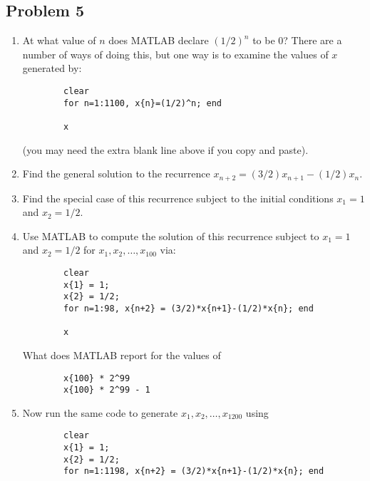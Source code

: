 \documentclass{article}
\begin{document}
\subsection*{Problem 5}
\begin{enumerate}
	\item At what value of $n$ does MATLAB declare $(1/2)^n$ to be $0$?
		There are a number of ways of doing this,
		but one way is to examine the values of $x$ generated by:
		\begin{verbatim}
		clear
		for n=1:1100, x{n}=(1/2)^n; end

		x
		\end{verbatim}
		(you may need the extra blank line above if you copy and paste).
	\item Find the general solution to the recurrence $x_{n+2} = (3/2)x_{n+1}-(1/2)x_n$.
	\item Find the special case of this recurrence subject to
		the initial conditions $x_1 = 1$ and $x_2 = 1/2$.
	\item Use MATLAB to compute the solution of this recurrence subject to
		$x_1 = 1$ and $x_2 = 1/2$ for $x_1,x_2,\dots,x_{100}$ via:
		\begin{verbatim}
		clear
		x{1} = 1;
		x{2} = 1/2;
		for n=1:98, x{n+2} = (3/2)*x{n+1}-(1/2)*x{n}; end

		x
		\end{verbatim}
		What does MATLAB report for the values of
		\begin{verbatim}
		x{100} * 2^99
		x{100} * 2^99 - 1
		\end{verbatim}
	\item Now run the same code to generate $x_1,x_2,\dots,x_{1200}$ using
		\begin{verbatim}
		clear
		x{1} = 1;
		x{2} = 1/2;
		for n=1:1198, x{n+2} = (3/2)*x{n+1}-(1/2)*x{n}; end


\end{verbatim}
\end{enumerate}
\end{document}

